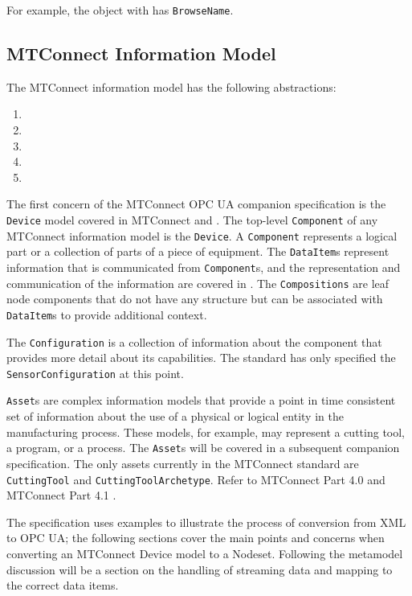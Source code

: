For example, the object with  has \texttt{BrowseName}.

\FloatBarrier

\subsection{MTConnect Information Model}

The MTConnect information model has the following abstractions:

\begin{enumerate}
\item {}
\item {}
\item {}
\item {}
\item {}
\end{enumerate}

The first concern of the MTConnect OPC UA companion specification is the \texttt{Device} model covered in MTConnect \cite{MTCPart2} and \cite{MTCPart3}. The top-level \texttt{Comp\-onent} of any MTConnect information model is the \texttt{Device}. A \texttt{Comp\-onent} represents a logical part or a collection of parts of a piece of equipment. The \texttt{Data\-Item}s represent information that is communicated from \texttt{Component}s, and the representation and communication of the information are covered in \cite{MTCPart3}. The \texttt{Compositions} are leaf node components that do not have any structure but can be associated with \texttt{Data\-Item}s to provide additional context. 

The \texttt{Configuration} is a collection of information about the component that provides more detail about its capabilities. The standard has only specified the \texttt{Sensor\-Configuration} at this point.

\texttt{Asset}s are complex information models that provide a point in time consistent set of information about the use of a physical or logical entity in the manufacturing process. These models, for example, may represent a cutting tool, a program, or a process. The \texttt{Asset}s will be covered in a subsequent companion specification. The only assets currently in the MTConnect standard are \texttt{CuttingTool} and \texttt{CuttingToolArchetype}. Refer to MTConnect Part 4.0 \cite{MTCPart40} and MTConnect Part 4.1 \cite{MTCPart41}.

The specification uses examples to illustrate the process of conversion from XML to OPC UA; the following sections cover the main points and concerns when converting an MTConnect Device model to a Nodeset. Following the metamodel discussion will be a section on the handling of streaming data and mapping to the correct data items. 

